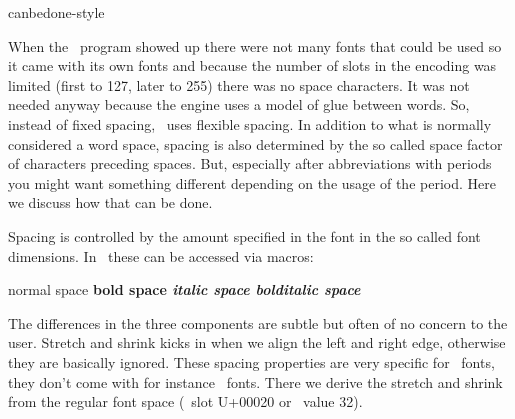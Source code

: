 
\environment canbedone-style


\startdocument
  [title=periods,
   color=darkred]

\startsectionlevel[title=Introduction]

When the \TEX\ program showed up there were not many fonts that could be used so
it came with its own fonts and because the number of slots in the encoding was
limited (first to 127, later to 255) there was no space characters. It was not
needed anyway because the engine uses a model of glue between words. So, instead
of fixed spacing, \TEX\ uses flexible spacing. In addition to what is normally
considered a word space, spacing is also determined by the so called space factor
of characters preceding spaces. But, especially after abbreviations with periods
you might want something different depending on the usage of the period. Here we
discuss how that can be done.

\stopsectionlevel

\startsectionlevel[title=Font related spacing]

Spacing is controlled by the amount specified in the font in the so called
font dimensions. In \CONTEXT\ these can be accessed via macros:

\starttabulate[||c|c|c|c|]
\BC                        \NC \tf normal space
                           \NC \bf bold space
                           \NC \it italic space
                           \NC \bi bolditalic space                    \NC \NR
\NC {}   \NC {\tf \expandafter}\the\interwordspace
                           \NC {\bf \expandafter}\the\interwordspace
                           \NC {\it \expandafter}\the\interwordspace
                           \NC {\bi \expandafter}\the\interwordspace   \NC \NR
\NC {} \NC {\tf \expandafter}\the\interwordstretch
                           \NC {\bf \expandafter}\the\interwordstretch
                           \NC {\it \expandafter}\the\interwordstretch
                           \NC {\bi \expandafter}\the\interwordstretch \NC \NR
\NC {}  \NC {\tf \expandafter}\the\interwordshrink
                           \NC {\it \expandafter}\the\interwordshrink
                           \NC {\bi \expandafter}\the\interwordshrink
                           \NC {\bf \expandafter}\the\interwordshrink  \NC \NR
\stoptabulate

The differences in the three components are subtle but often of no concern to the
user. Stretch and shrink kicks in when we align the left and right edge,
otherwise they are basically ignored. These spacing properties are very specific
for \TEX\ fonts, they don't come with for instance \OPENTYPE\ fonts. There we
derive the stretch and shrink from the regular font space (\UNICODE\ slot U+00020
or \ASCII\ value 32).

